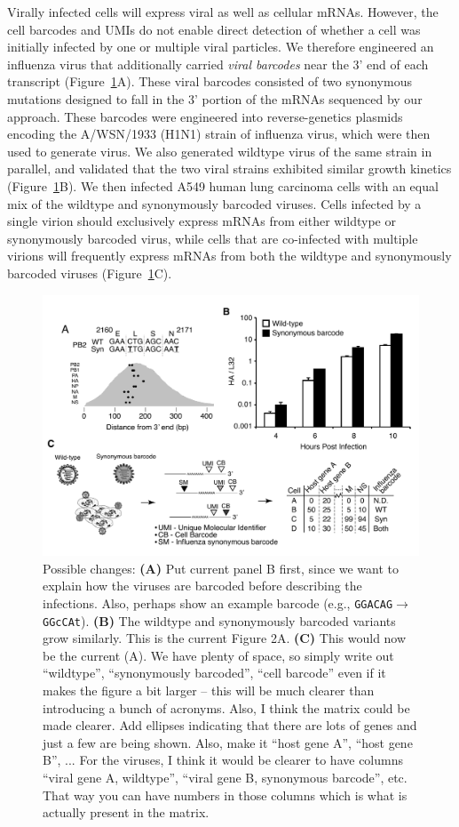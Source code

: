 \documentclass[9pt,lineno]{elife}
\begin{document}
Virally infected cells will express viral as well as cellular mRNAs.
However, the cell barcodes and UMIs do not enable direct detection of whether a cell was initially infected by one or multiple viral particles.
We therefore engineered an influenza virus that additionally carried \emph{viral barcodes} near the 3' end of each transcript (Figure~\ref{fig:workflow}A).
These viral barcodes consisted of two synonymous mutations designed to fall in the 3' portion of the mRNAs sequenced by our approach.
These barcodes were engineered into reverse-genetics plasmids encoding the A/WSN/1933 (H1N1) strain of influenza virus, which were then used to generate virus.
We also generated wildtype virus of the same strain in parallel, and validated that the two viral strains exhibited similar growth kinetics (Figure~\ref{fig:workflow}B).
We then infected A549 human lung carcinoma cells with an equal mix of the wildtype and synonymously barcoded viruses.
Cells infected by a single virion should exclusively express mRNAs from either wildtype or synonymously barcoded virus, while cells that are co-infected with multiple virions will frequently express mRNAs from both the wildtype and synonymously barcoded viruses (Figure~\ref{fig:workflow}C).

\begin{figure}
\includegraphics[width=0.8\linewidth]{figures/Workflow/workflow.pdf}
\caption{\label{fig:workflow}
Possible changes:
{\bf (A)} Put current panel B first, since we want to explain how the viruses are barcoded before describing the infections. Also, perhaps show an example barcode (e.g., \texttt{GGACAG}$\rightarrow$\texttt{GGcCAt}).
{\bf (B)} The wildtype and synonymously barcoded variants grow similarly.
This is the current Figure 2A.
{\bf (C)} This would now be the current (A). We have plenty of space, so simply write out ``wildtype'', ``synonymously barcoded'', ``cell barcode'' even if it makes the figure a bit larger -- this will be much clearer than introducing a bunch of acronyms.
Also, I think the matrix could be made clearer.
Add ellipses indicating that there are lots of genes and just a few are being shown. Also, make it ``host gene A'', ``host gene B'', ...
For the viruses, I think it would be clearer to have columns ``viral gene A, wildtype'', ``viral gene B, synonymous barcode'', etc.
That way you can have numbers in those columns which is what is actually present in the matrix.
}
\end{figure}
\end{document}
